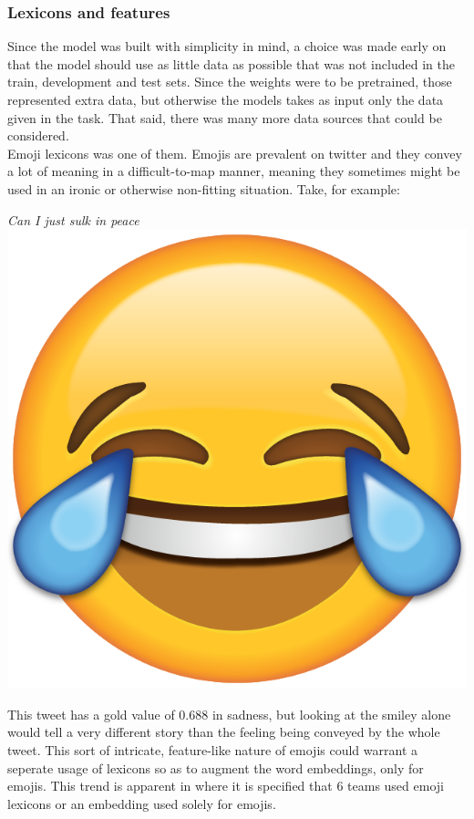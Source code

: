 \subsubsection{Lexicons and features}
Since the model was built with simplicity in mind, a choice was made early on that the model should use as little data as possible that was not included in the train, development and test sets. Since the weights were to be pretrained, those represented extra data, but otherwise the models takes as input only the data given in the task. That said, there was many more data sources that could be considered.\\
Emoji lexicons was one of them. Emojis are prevalent on twitter and they convey a lot of meaning in a difficult-to-map manner, meaning they sometimes might be used in an ironic or otherwise non-fitting situation. Take, for example:\\
\begin{center}
\textit{Can I just sulk in peace} \includegraphics[scale=0.015]{pictures/tears_of_joy_emoji.png}
\end{center}
This tweet has a gold value of 0.688 in sadness, but looking at the smiley alone would tell a very different story than the feeling being conveyed by the whole tweet. This sort of intricate, feature-like nature of emojis could warrant a seperate usage of lexicons so as to augment the word embeddings, only for emojis. This trend is apparent in \cite{wassa2017} where it is specified that 6 teams used emoji lexicons or an embedding used solely for emojis.\\
